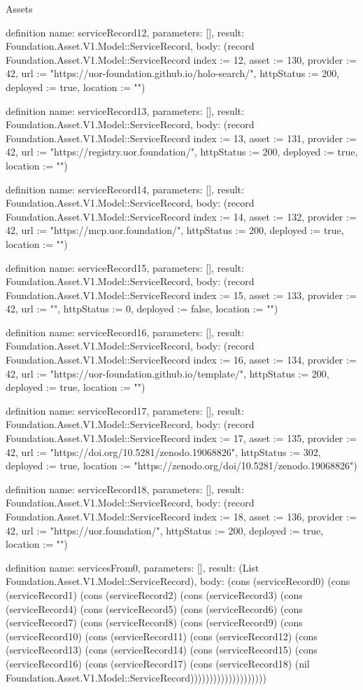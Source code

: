 \begin{lexlean}{Assets}
\begin{semanticmodule}
definition{
  name: serviceRecord12,
  parameters: [],
  result: Foundation.Asset.V1.Model::ServiceRecord,
  body: (record Foundation.Asset.V1.Model::ServiceRecord {index := 12, asset := 130, provider := 42, url := "https://uor-foundation.github.io/holo-search/", httpStatus := 200, deployed := true, location := ""})
}

definition{
  name: serviceRecord13,
  parameters: [],
  result: Foundation.Asset.V1.Model::ServiceRecord,
  body: (record Foundation.Asset.V1.Model::ServiceRecord {index := 13, asset := 131, provider := 42, url := "https://registry.uor.foundation/", httpStatus := 200, deployed := true, location := ""})
}

definition{
  name: serviceRecord14,
  parameters: [],
  result: Foundation.Asset.V1.Model::ServiceRecord,
  body: (record Foundation.Asset.V1.Model::ServiceRecord {index := 14, asset := 132, provider := 42, url := "https://mcp.uor.foundation/", httpStatus := 200, deployed := true, location := ""})
}

definition{
  name: serviceRecord15,
  parameters: [],
  result: Foundation.Asset.V1.Model::ServiceRecord,
  body: (record Foundation.Asset.V1.Model::ServiceRecord {index := 15, asset := 133, provider := 42, url := "", httpStatus := 0, deployed := false, location := ""})
}

definition{
  name: serviceRecord16,
  parameters: [],
  result: Foundation.Asset.V1.Model::ServiceRecord,
  body: (record Foundation.Asset.V1.Model::ServiceRecord {index := 16, asset := 134, provider := 42, url := "https://uor-foundation.github.io/template/", httpStatus := 200, deployed := true, location := ""})
}

definition{
  name: serviceRecord17,
  parameters: [],
  result: Foundation.Asset.V1.Model::ServiceRecord,
  body: (record Foundation.Asset.V1.Model::ServiceRecord {index := 17, asset := 135, provider := 42, url := "https://doi.org/10.5281/zenodo.19068826", httpStatus := 302, deployed := true, location := "https://zenodo.org/doi/10.5281/zenodo.19068826"})
}

definition{
  name: serviceRecord18,
  parameters: [],
  result: Foundation.Asset.V1.Model::ServiceRecord,
  body: (record Foundation.Asset.V1.Model::ServiceRecord {index := 18, asset := 136, provider := 42, url := "https://uor.foundation/", httpStatus := 200, deployed := true, location := ""})
}

definition{
  name: servicesFrom0,
  parameters: [],
  result: (List Foundation.Asset.V1.Model::ServiceRecord),
  body: (cons (serviceRecord0) (cons (serviceRecord1) (cons (serviceRecord2) (cons (serviceRecord3) (cons (serviceRecord4) (cons (serviceRecord5) (cons (serviceRecord6) (cons (serviceRecord7) (cons (serviceRecord8) (cons (serviceRecord9) (cons (serviceRecord10) (cons (serviceRecord11) (cons (serviceRecord12) (cons (serviceRecord13) (cons (serviceRecord14) (cons (serviceRecord15) (cons (serviceRecord16) (cons (serviceRecord17) (cons (serviceRecord18) (nil Foundation.Asset.V1.Model::ServiceRecord))))))))))))))))))))
}


\end{semanticmodule}
\end{lexlean}
